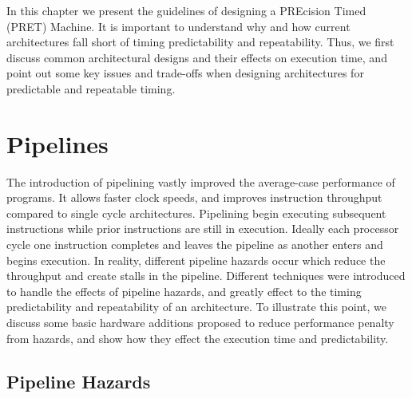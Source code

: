 In this chapter we present the guidelines of designing a PREcision Timed (PRET) Machine. 
It is important to understand why and how current architectures fall short of timing predictability and repeatability.
Thus, we first discuss common architectural designs and their effects on execution time, and point out some key issues and trade-offs when designing architectures for predictable and repeatable timing.

\section{Pipelines}
The introduction of pipelining vastly improved the average-case performance of programs.
It allows faster clock speeds, and improves instruction throughput compared to single cycle architectures.
Pipelining begin executing subsequent instructions while prior instructions are still in execution. 
Ideally each processor cycle one instruction completes and leaves the pipeline as another enters and begins execution. 
In reality, different pipeline hazards occur which reduce the throughput and create stalls in the pipeline.
Different techniques were introduced to handle the effects of pipeline hazards, and greatly effect to the timing predictability and repeatability of an architecture.     
To illustrate this point, we discuss some basic hardware additions proposed to reduce performance penalty from hazards, and show how they effect the execution time and predictability. 

\subsection{Pipeline Hazards}
\label{sec:pipeline_hazards}

